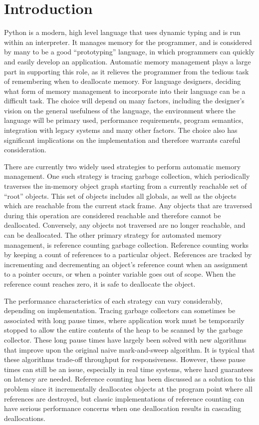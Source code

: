 \documentclass{sigplanconf}
\begin{document}
\section{Introduction}

Python is a modern, high level language that uses dynamic typing and is run within an interpreter.  It manages memory for the programmer, and is considered by many to be a good ``prototyping'' language, in which programmers can quickly and easily develop an application.   Automatic memory management plays a large part in supporting this role, as it relieves the programmer from the tedious task of remembering when to deallocate memory.  For language designers, deciding what form of memory management to incorporate into their language can be a difficult task.  The choice will depend on many factors, including the designer's vision on the general usefulness of the language, the environment where the language will be primary used, performance requirements, program semantics, integration with legacy systems and many other factors.  The choice also has significant implications on the implementation and therefore warrants careful consideration.  

There are currently two widely used strategies to perform automatic memory management.  One such strategy is tracing garbage collection, which periodically traverses the in-memory object graph starting from a currently reachable set of ``root'' objects.  This set of objects includes all globals, as well as the objects which are reachable from the current stack frame.  Any objects that are traversed during this operation are considered reachable and therefore cannot be deallocated.  Conversely, any objects not traversed are no longer reachable, and can be deallocated.  The other primary strategy for automated memory management, is reference counting garbage collection. Reference counting works by keeping a count of references to a particular object.  References are tracked by incrementing and decrementing an object's reference count when an assignment to a pointer occurs, or when a pointer variable goes out of scope.  When the reference count reaches zero, it is safe to deallocate the object.

The performance characteristics of each strategy can vary considerably, depending on implementation.   Tracing garbage collectors can sometimes be associated with long pause times, where application work must be temporarily stopped to allow the entire contents of the heap to be scanned by the garbage collector.  These long pause times have largely been solved with new algorithms that improve upon the original naive mark-and-sweep algorithm.  It is typical that these algorithms trade-off throughput for responsiveness.  However, these pause times can still be an issue, especially in real time systems, where hard guarantees on latency are needed.  Reference counting has been discussed as a solution to this problem since it incrementally deallocates objects at the program point where all references are destroyed, but classic implementations of reference counting can have serious performance concerns when one deallocation results in cascading deallocations\cite{boehm}.  
\end{document}
